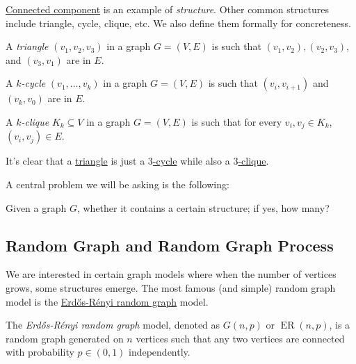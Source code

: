\hyperref[def:connected-component]{Connected component} is an example of \emph{structure}. Other common structures include triangle, cycle, clique, etc. We also define them formally for concreteness.

\begin{definition}[Triangle]\label{def:triangle}
	A \emph{triangle} \((v_1, v_2, v_3)\) in a graph \(G = (V, E)\) is such that \((v_1, v_2), (v_2, v_3)\), and \((v_3, v_1)\) are in \(E\).
\end{definition}

\begin{definition}[Cycle]\label{def:cycle}
	A \emph{\(k\)-cycle} \((v_1, \dots , v_k)\) in a graph \(G = (V, E)\) is such that \((v_i, v_{i+1})\) and \((v_k, v_0)\) are in \(E\).
\end{definition}

\begin{definition}[Clique]\label{def:clique}
	A \emph{\(k\)-clique} \(K_k \subseteq V\) in a graph \(G = (V, E)\) is such that for every \(v_i, v_j \in K_k\), \((v_i, v_j) \in E\).
\end{definition}

\begin{eg}
	It's clear that a \hyperref[def:triangle]{triangle} is just a \hyperref[def:cycle]{\(3\)-cycle} while also a \hyperref[def:clique]{\(3\)-clique}.
\end{eg}

A central problem we will be asking is the following:

\begin{problem*}[Property]
	Given a graph \(G\), whether it contains a certain structure; if yes, how many?
\end{problem*}

\subsection{Random Graph and Random Graph Process}
We are interested in certain graph models where when the number of vertices grows, some structures emerge. The most famous (and simple) random graph model is the \hyperref[def:Erdős-Rényi-random-graph]{Erdős-Rényi random graph} model.

\begin{definition}\label{def:Erdős-Rényi-random-graph}
	The \emph{Erdős-Rényi random graph} model, denoted as \(G(n, p)\) or \(\operatorname{ER}(n, p) \), is a random graph generated on \(n\) vertices such that any two vertices are connected with probability \(p \in (0, 1)\) independently.
\end{definition}

